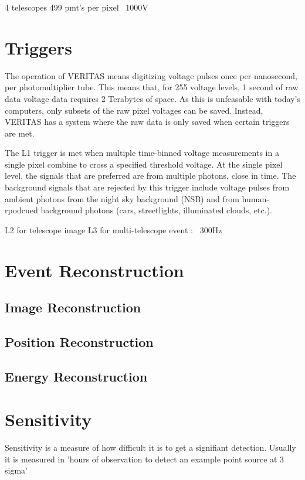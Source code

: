 4 telescopes
499 pmt's per pixel
~1000V

\section{Triggers}\label{sec:trig}

The operation of VERITAS means digitizing voltage pulses once per nanosecond, per photomultiplier tube.
This means that, for 255 voltage levels, 1 second of raw data voltage data requires 2 Terabytes of space.
As this is unfeasable with today's computers, only subsets of the raw pixel voltages can be saved.
Instead, VERITAS has a system where the raw data is only saved when certain triggers are met.

The L1 trigger is met when multiple time-binned voltage measurements in a single pixel combine to cross a specified threshold voltage.
At the single pixel level, the signals that are preferred are from multiple photons, close in time.
The background signals that are rejected by this trigger include voltage pulses from ambient photons from the night sky background (NSB) and from human-rpodcued background photons (cars, streetlights, illuminated clouds, etc.).

L2 for telescope image
L3 for multi-telescope event : ~300Hz

\section{Event Reconstruction}\label{sec:recon}

\subsection{Image Reconstruction}\label{subsec:imgrecon}

\subsection{Position Reconstruction}\label{subsec:posrecon}

\subsection{Energy Reconstruction}\label{subsec:enrecon}

\section{Sensitivity}
Sensitivity is a measure of how difficult it is to get a signifiant detection.
Usually it is measured in 'hours of observation to detect an example point source at 3 sigma'


